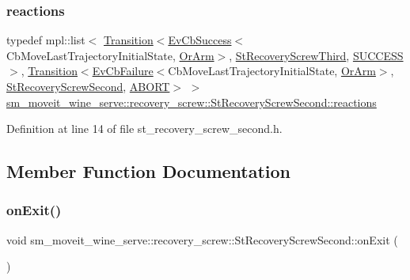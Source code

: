 \subsubsection{\texorpdfstring{reactions}{reactions}}
{\footnotesize\ttfamily typedef mpl\+::list$<$ \hyperlink{classsmacc_1_1Transition}{Transition}$<$\hyperlink{structsmacc_1_1EvCbSuccess}{Ev\+Cb\+Success}$<$Cb\+Move\+Last\+Trajectory\+Initial\+State, \hyperlink{classsm__moveit__wine__serve_1_1OrArm}{Or\+Arm}$>$, \hyperlink{structsm__moveit__wine__serve_1_1recovery__screw_1_1StRecoveryScrewThird}{St\+Recovery\+Screw\+Third}, \hyperlink{structsmacc_1_1default__transition__tags_1_1SUCCESS}{S\+U\+C\+C\+E\+SS}$>$, \hyperlink{classsmacc_1_1Transition}{Transition}$<$\hyperlink{structsmacc_1_1EvCbFailure}{Ev\+Cb\+Failure}$<$Cb\+Move\+Last\+Trajectory\+Initial\+State, \hyperlink{classsm__moveit__wine__serve_1_1OrArm}{Or\+Arm}$>$, \hyperlink{structsm__moveit__wine__serve_1_1recovery__screw_1_1StRecoveryScrewSecond}{St\+Recovery\+Screw\+Second}, \hyperlink{structsmacc_1_1default__transition__tags_1_1ABORT}{A\+B\+O\+RT}$>$ $>$ \hyperlink{structsm__moveit__wine__serve_1_1recovery__screw_1_1StRecoveryScrewSecond_a00e1a1cd8c8bf171f2bd685a9693a413}{sm\+\_\+moveit\+\_\+wine\+\_\+serve\+::recovery\+\_\+screw\+::\+St\+Recovery\+Screw\+Second\+::reactions}}



Definition at line 14 of file st\+\_\+recovery\+\_\+screw\+\_\+second.\+h.



\subsection{Member Function Documentation}
\mbox{\label{structsm__moveit__wine__serve_1_1recovery__screw_1_1StRecoveryScrewSecond_abbbeb48581c51e820bd4d1c96ea9631b}} 
\subsubsection{\texorpdfstring{on\+Exit()}{onExit()}}
{\footnotesize\ttfamily void sm\+\_\+moveit\+\_\+wine\+\_\+serve\+::recovery\+\_\+screw\+::\+St\+Recovery\+Screw\+Second\+::on\+Exit (\begin{DoxyParamCaption}{ }\end{DoxyParamCaption})\hspace{0.3cm}{\ttfamily [inline]}}



